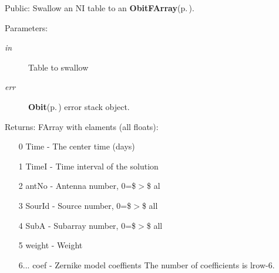 Public: Swallow an NI table to an {\bf Obit\-FArray}{\rm (p.\,\pageref{structObitFArray})}. 

\begin{Desc}
\item[Parameters:]
\begin{description}
\item[{\em in}]Table to swallow \item[{\em err}]{\bf Obit}{\rm (p.\,\pageref{structObit})} error stack object. \end{description}
\end{Desc}
\begin{Desc}
\item[Returns:]FArray with elaments (all floats): \begin{itemize}
\item [0] Time - The center time (days) \item [1] Time\-I - Time interval of the solution \item [2] ant\-No - Antenna number, 0=\$$>$\$ al \item [3] Sour\-Id - Source number, 0=\$$>$\$ all \item [4] Sub\-A - Subarray number, 0=\$$>$\$ all \item [5] weight - Weight \item [6...] coef - Zernike model coeffients The number of coefficients is lrow-6. \end{itemize}
\end{Desc}
